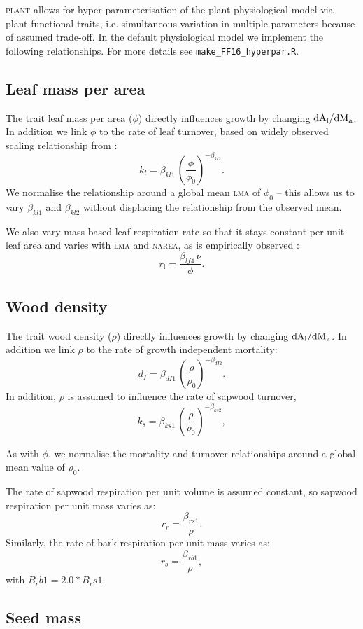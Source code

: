 \documentclass[10pt,twoside]{article}
\newcommand{\plant}{\textsc{plant}}
\begin{document}
{\plant} allows for
hyper-parameterisation of the plant physiological model via plant functional traits, i.e.
simultaneous variation in multiple parameters because of assumed trade-off. In the
default physiological model we implement the following relationships. For more
details see \texttt{make\_FF16\_hyperpar.R}.

\subsection{Leaf mass per area}

The trait leaf mass per area ($\phi$) directly influences growth by changing
$\rm{d}A_\textrm{l} / \rm{d}M_\textrm{a}$. In addition we
link $\phi$ to the rate of leaf turnover,
based on widely observed scaling relationship from \citet{Wright-2004}:
$$k_l = \beta_{kl1} \, \left(\frac{\phi}{\phi_0}\right)^{-\beta_{kl2}}.$$
We normalise the relationship around a global mean \textsc{lma} of $\phi_0$ -- this
allows us to vary $\beta_{kl1}$ and $\beta_{kl2}$ without displacing the relationship from the
observed mean.

We also vary mass based leaf respiration rate so that it stays constant per unit leaf area and
varies with \textsc{lma} and \textsc{narea}, as is empirically observed \citet{Wright-2004}:
$$r_\textrm{l} = \frac{\beta_{lf4}\, \nu}{\phi}.$$

\subsection{Wood density}

The trait wood density ($\rho$) directly influences growth by changing
$\rm{d}A_\textrm{l} / \rm{d}M_\textrm{a}$.  In addition we
link $\rho$ to the rate of growth independent mortality:
$$d_I = \beta_{dI1} \, \left(\frac{\rho}{\rho_0}\right) ^ {-\beta_{dI2}}.$$
In addition, $\rho$ is assumed to influence the rate of sapwood turnover,
$$k_s = \beta_{ks1} \, \left(\frac{\rho}{\rho_0}\right)^ {-\beta_{ks2}},$$

As with $\phi$, we normalise the mortality and turnover
relationships around a global mean value of $\rho_0$.

The rate of sapwood respiration per unit volume is assumed constant, so
sapwood respiration per unit mass varies as:
$$r_r = \frac{\beta_{rs1}}{\rho}.$$
Similarly, the rate of bark respiration per unit mass varies as:
$$r_b = \frac{\beta_{rb1}}{\rho},$$
with $B_rb1 = 2.0*B_rs1$.

\subsection{Seed mass}
\end{document}
